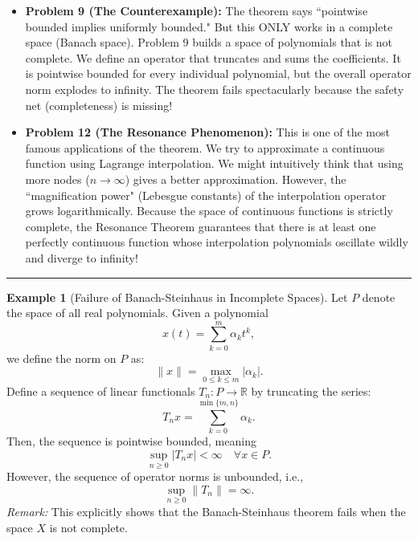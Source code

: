 \documentclass[11pt,a4paper]{article}
\theoremstyle{plain}
\theoremstyle{definition}
\newtheorem{example}{Example}[section]
\begin{document}
\begin{itemize}
    \item \textbf{Problem 9 (The Counterexample):} The theorem says ``pointwise bounded implies uniformly bounded." But this ONLY works in a complete space (Banach space). Problem 9 builds a space of polynomials that is not complete. We define an operator that truncates and sums the coefficients. It is pointwise bounded for every individual polynomial, but the overall operator norm explodes to infinity. The theorem fails spectacularly because the safety net (completeness) is missing!
    \item \textbf{Problem 12 (The Resonance Phenomenon):} This is one of the most famous applications of the theorem. We try to approximate a continuous function using Lagrange interpolation. We might intuitively think that using more nodes ($n \to \infty$) gives a better approximation. However, the ``magnification power" (Lebesgue constants) of the interpolation operator grows logarithmically. Because the space of continuous functions is strictly complete, the Resonance Theorem guarantees that there is at least one perfectly continuous function whose interpolation polynomials oscillate wildly and diverge to infinity!
\end{itemize}

\vspace{1.5em}
\hrule
\vspace{1.5em}

\begin{example}[Failure of Banach-Steinhaus in Incomplete Spaces]
    Let $P$ denote the space of all real polynomials. Given a polynomial
    \[
        x(t) = \sum_{k=0}^{m}\alpha_{k}t^{k},
    \]
    we define the norm on $P$ as:
    \[
        \|x\| = \max_{0\le k\le m}|\alpha_{k}|.
    \]
    Define a sequence of linear functionals $T_n : P \to \mathbb{R}$ by truncating the series:
    \[
        T_{n}x = \sum_{k=0}^{\min\{m,n\}}\alpha_{k}.
    \]
    Then, the sequence is pointwise bounded, meaning
    \[
        \sup_{n\ge 0}|T_{n}x| < \infty \quad \forall x \in P.
    \]
    However, the sequence of operator norms is unbounded, i.e.,
    \[
        \sup_{n\ge 0}\|T_{n}\| = \infty.
    \]
    \textit{Remark:} This explicitly shows that the Banach-Steinhaus theorem fails when the space $X$ is not complete.
\end{example}
\end{document}
